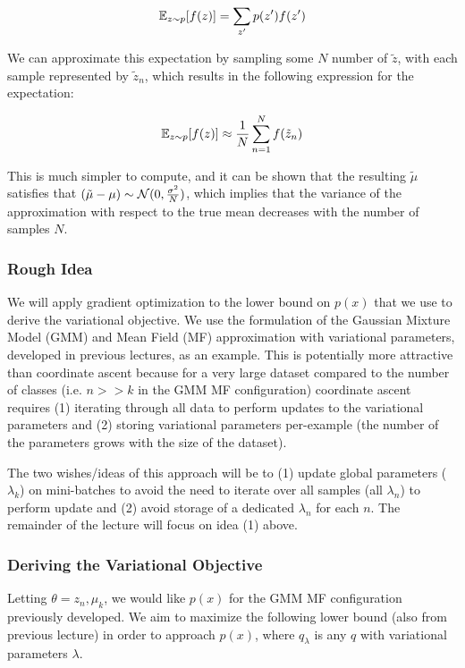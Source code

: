 \documentclass{article}
\begin{document}
$$
\mathbb{E}_{z \sim p}[f(z)] = \sum_{z'} p(z') f(z')
$$

We can approximate this expectation by sampling some $N$ number of $\tilde{z}$, with each sample represented by $\tilde{z}_n$, which results in the following expression for the expectation:

$$
\mathbb{E}_{z \sim p}[f(z)] \approx \frac{1}{N} \sum_{n=1}^{N} f(\tilde{z}_n)
$$

This is much simpler to compute, and it can be shown that the resulting $\tilde{\mu}$ satisfies that $(\tilde{\mu}- \mu) \sim \mathcal{N}(0, \frac{\sigma^2}{N})$, which implies that the variance of the approximation with respect to the true mean decreases with the number of samples $N$.

\subsubsection{Rough Idea}

We will apply gradient optimization to the lower bound on $p(x)$ that we use to derive the variational objective.  
We use the formulation of the Gaussian Mixture Model (GMM) and Mean Field (MF) approximation with variational parameters, developed in previous lectures, as an example.  
This is potentially more attractive than coordinate ascent because for a very large dataset compared to the number of classes (i.e. $n >> k$ in the GMM MF configuration) coordinate ascent requires (1) iterating through all data to perform updates to the variational parameters and (2) storing variational parameters per-example (the number of the parameters grows with the size of the dataset).


The two wishes/ideas of this approach will be to (1) update global parameters ($\lambda_k$) on mini-batches to avoid the need to iterate over all samples (all $\lambda_n$) to perform update and (2) avoid storage of a dedicated $\lambda_n$ for each $n$.
The remainder of the lecture will focus on idea (1) above.


\subsubsection{Deriving the Variational Objective}

Letting $\theta = {z_n, \mu_k}$, we would like $p(x)$ for the GMM MF configuration previously developed.  
We aim to maximize the following lower bound (also from previous lecture) in order to approach $p(x)$, where $q_{\lambda}$ is any $q$ with variational parameters $\lambda$.
\end{document}
